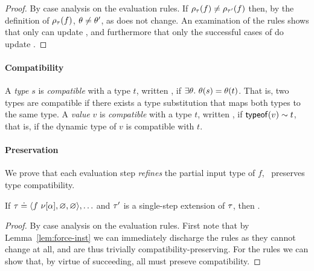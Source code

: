 \begin{proof}
  By case analysis on the evaluation rules.
  If $\rho_{\tau}(f) \neq \rho_{\tau'}(f)$ then,
  by the definition of $\rho_{\tau}(f)$, $\theta \neq \theta'$, as \thole
  does not change.
  An examination of the rules shows that only \forcesym can update \tsu,
  and furthermore that only the successful cases of \forcesym do update
  \tsu.
\end{proof}


\paragraph{Compatibility}
%
A \emph{type} $s$ is \emph{compatible} with a type $t$, written ,
if $\exists \theta.\ \theta(s) = \theta(t)$.
%
That is, two types are compatible if there exists a type substitution
that maps both types to the same type.
%
A \emph{value} $v$ is \emph{compatible} with a type $t$, written ,
if $\mathsf{typeof}(v) \sim t$, that is, if the dynamic type of $v$ is
compatible with $t$.

\paragraph{Preservation}
We prove that each evaluation step \emph{refines} the partial input type
of $f$, \ie\ preserves type compatibility.
%
\begin{lem}
\label{lem:refine-partial}
If $\tau \doteq \langle f\ \nu[\alpha], \varnothing, \varnothing \rangle,\ldots$ and
$\tau'$ is a single-step extension of $\tau$, %
%
%
then .
\end{lem}
\begin{proof}
  By case analysis on the evaluation rules.
  First note that by Lemma~\ref{lem:force-inst} we can immediately
  discharge the  rules as they cannot change
   at all, and are thus trivially
  compatibility-preserving. For the  rules we can
  show that, by virtue of \forcesym succeeding, all must preseve
  compatibility.
\end{proof}

